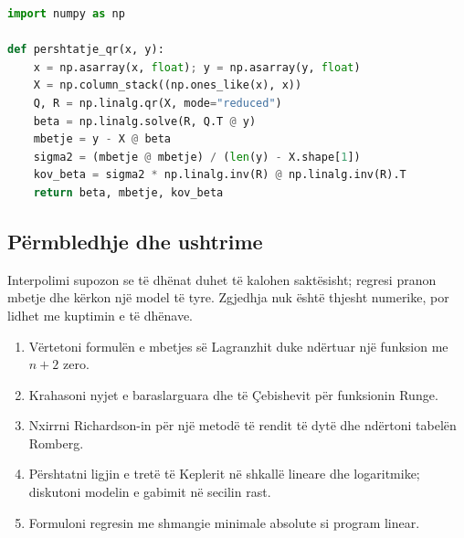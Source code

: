 \documentclass[11pt,oneside,openany]{book}
\begin{document}
\begin{lstlisting}[language=Python,caption={Përshtatje lineare me QR dhe diagnostikë të mbetjeve.}]
import numpy as np

def pershtatje_qr(x, y):
    x = np.asarray(x, float); y = np.asarray(y, float)
    X = np.column_stack((np.ones_like(x), x))
    Q, R = np.linalg.qr(X, mode="reduced")
    beta = np.linalg.solve(R, Q.T @ y)
    mbetje = y - X @ beta
    sigma2 = (mbetje @ mbetje) / (len(y) - X.shape[1])
    kov_beta = sigma2 * np.linalg.inv(R) @ np.linalg.inv(R).T
    return beta, mbetje, kov_beta
\end{lstlisting}

\subsection{Përmbledhje dhe ushtrime}
Interpolimi supozon se të dhënat duhet të kalohen saktësisht; regresi pranon mbetje dhe kërkon një model të tyre. Zgjedhja nuk është thjesht numerike, por lidhet me kuptimin e të dhënave.
\begin{enumerate}
\item Vërtetoni formulën e mbetjes së Lagranzhit duke ndërtuar një funksion me $n+2$ zero.
\item Krahasoni nyjet e baraslarguara dhe të Çebishevit për funksionin Runge.
\item Nxirrni Richardson-in për një metodë të rendit të dytë dhe ndërtoni tabelën Romberg.
\item Përshtatni ligjin e tretë të Keplerit në shkallë lineare dhe logaritmike; diskutoni modelin e gabimit në secilin rast.
\item Formuloni regresin me shmangie minimale absolute si program linear.
\end{enumerate}



\end{document}
